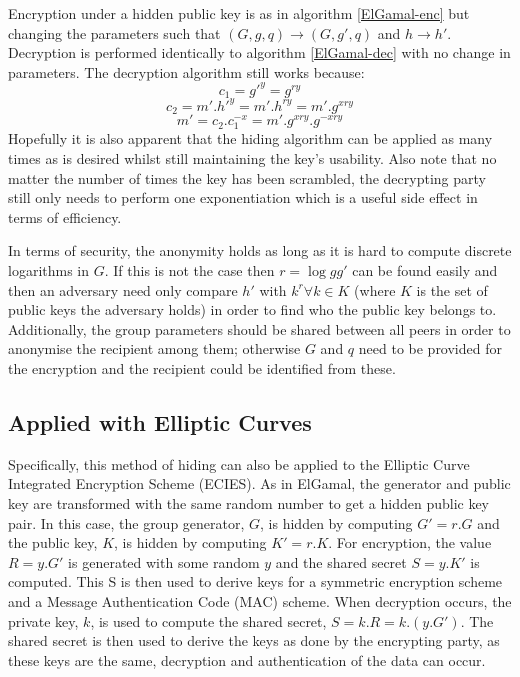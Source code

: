 \documentclass[ %
                    author={Luke Murray},
                supervisor={Dr. Simon Hollis},
                     title={Shadow Peer-to-Peer Networks},
                  subtitle={},
                    degree={MEng},
                      year={2013} ]{thesis}
\begin{document}
Encryption under a hidden public key is as in algorithm \ref{ElGamal-enc} but changing the parameters such that $(G, g, q) \rightarrow (G, g\prime, q)$ and $h \rightarrow h\prime$. Decryption is performed identically to algorithm \ref{ElGamal-dec} with no change in parameters. The decryption algorithm still works because:
\[c_1 = g\prime^{y} = g^{ry}\]
\[c_2 = m\prime.h\prime^{y} = m\prime.h^{ry} = m\prime.g^{xry}\]
\[m\prime = c_2.c_1^{-x} = m\prime.g^{xry}.g^{-xry}\]
Hopefully it is also apparent that the hiding algorithm can be applied as many times as is desired whilst still maintaining the key's usability. Also note that no matter the number of times the key has been scrambled, the decrypting party still only needs to perform one exponentiation which is a useful side effect in terms of efficiency. 

In terms of security, the anonymity holds as long as it is hard to compute discrete logarithms in $G$. If this is not the case then $r = \log{g}g\prime$ can be found easily and then an adversary need only compare $h\prime$ with $k^{r} \forall k \in K$ (where $K$ is the set of public keys the adversary holds) in order to find who the public key belongs to. Additionally, the group parameters should be shared between all peers in order to anonymise the recipient among them; otherwise $G$ and $q$ need to be provided for the encryption and the recipient could be identified from these.

\subsection{Applied with Elliptic Curves}

Specifically, this method of hiding can also be applied to the Elliptic Curve Integrated Encryption Scheme (ECIES)\cite{ECIES}. As in ElGamal, the generator and public key are transformed with the same random number to get a hidden public key pair. In this case, the group generator, $G$, is hidden by computing $G\prime = r.G$ and the public key, $K$, is hidden by computing $K\prime = r.K$. For encryption, the value $R = y.G\prime$ is generated with some random $y$ and the shared secret $S = y.K\prime$ is computed. This S is then used to derive keys for a symmetric encryption scheme and a Message Authentication Code (MAC) scheme. When decryption occurs, the private key, $k$, is used to compute the shared secret, $S = k.R = k.(y.G\prime)$. The shared secret is then used to derive the keys as done by the encrypting party, as these keys are the same, decryption and authentication of the data can occur.
\end{document}
